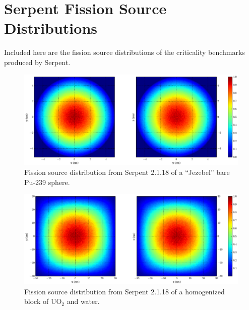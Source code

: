\section{Serpent Fission Source Distributions}

Included here are the fission source distributions of the criticality benchmarks produced by Serpent.  

\begin{figure}[h!] 
  \centering
    \includegraphics[width=\textwidth,trim= 4cm 0cm 6cm 0cm]{graphics/finalresults/godiva_fiss_serp-6.eps}
     \caption{Fission source distribution from Serpent 2.1.18 of a ``Jezebel'' bare Pu-239 sphere. \label{serp_godiva_mesh} }
\end{figure}

\begin{figure}[h!] 
  \centering
    \includegraphics[width=\textwidth,trim= 4cm 0cm 6cm 0cm]{graphics/finalresults/homfuel_fiss_serp-6.eps}
     \caption{Fission source distribution from Serpent 2.1.18 of a homogenized block of UO$_2$ and water. \label{serp_homfuel_mesh} }
\end{figure}

